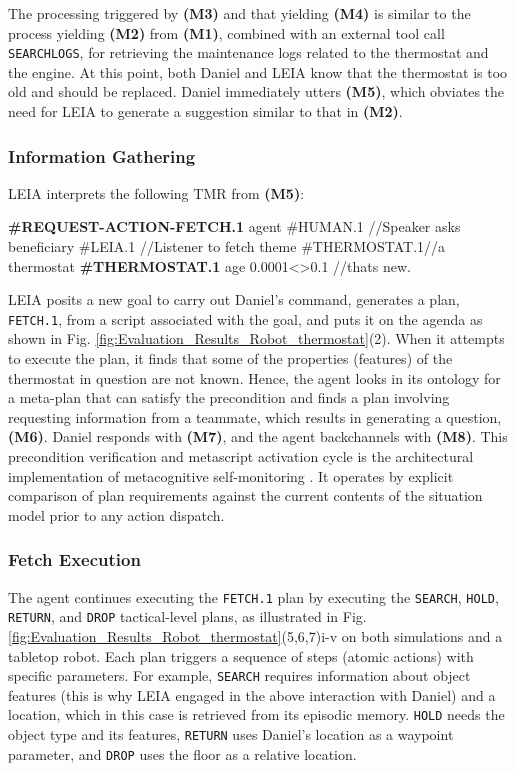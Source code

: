 \documentclass[letterpaper, 10 pt, conference]{ieeeconf}  %
\begin{document}
The processing triggered by \textbf{(M3)} and that yielding \textbf{(M4)} is similar to the process yielding \textbf{(M2)} from \textbf{(M1)}, combined with an external tool call \texttt{SEARCHLOGS}, for retrieving the maintenance logs related to the thermostat and the engine. At this point, both Daniel and LEIA know that the thermostat is too old and should be replaced. Daniel immediately utters \textbf{(M5)}, which obviates the need for LEIA to generate a suggestion similar to that in \textbf{(M2)}.

\subsubsection{Information Gathering}  LEIA interprets the following TMR from \textbf{(M5)}:
\begin{codeblock}
\textbf{#REQUEST-ACTION-FETCH.1}
 agent       #HUMAN.1     //Speaker asks
 beneficiary #LEIA.1      //Listener to fetch
 theme       #THERMOSTAT.1//a thermostat
\textbf{#THERMOSTAT.1}
 age        0.0001<>0.1   //thats new.
\end{codeblock}

LEIA posits a new goal to carry out Daniel's command, generates a plan, \texttt{FETCH.1}, from a script associated with the goal, and puts it on the agenda as shown in Fig. \ref{fig:Evaluation_Results_Robot_thermostat}(2). When it attempts to execute the plan, it finds that some of the properties (features) of the thermostat in question are not known. Hence, the agent looks in its ontology for a meta-plan that can satisfy the precondition and finds a plan involving requesting information from a teammate, which results in generating a question, \textbf{(M6)}. Daniel responds with \textbf{(M7)}, and the agent backchannels with \textbf{(M8)}. This precondition verification and metascript activation cycle is the architectural implementation of metacognitive self-monitoring \cite{mcshane2024agents-172,mcshane2021linguistics-995}. It operates by explicit comparison of plan requirements against the current contents of the situation model prior to any action dispatch. 

\subsubsection{Fetch Execution} 
 The agent continues executing the \texttt{FETCH.1} plan by executing the \texttt{SEARCH}, \texttt{HOLD}, \texttt{RETURN}, and \texttt{DROP} tactical-level plans, as illustrated in Fig. \ref{fig:Evaluation_Results_Robot_thermostat}(5,6,7)i-v on both simulations and a tabletop robot. Each plan triggers a sequence of steps (atomic actions) with specific parameters. For example, \texttt{SEARCH} requires information about object features (this is why LEIA engaged in the above interaction with Daniel) and a location, which in this case is retrieved from its episodic memory. \texttt{HOLD} needs the object type and its features, \texttt{RETURN} uses Daniel's location as a waypoint parameter, and \texttt{DROP} uses the floor as a relative location.
\end{document}
